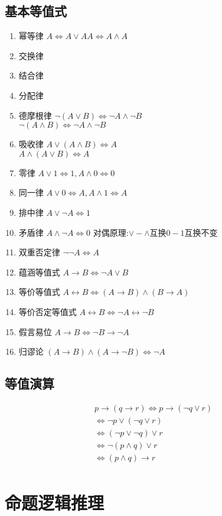 \documentclass{book}
\newcommand{\Eqv}{\Leftrightarrow}
\newcommand{\eqv}{\leftrightarrow}
\begin{document}
\subsection{基本等值式}
\begin{enumerate}
\item 幂等律 $A\Leftrightarrow A\lor A$$A \Leftrightarrow A\land A$
\item 交换律
\item 结合律
\item 分配律
\item 德摩根律 $\neg (A\lor B) \Leftrightarrow \neg A\land \neg B$\\
$\neg (A \land B) \Eqv \neg A \land \neg B$
\item 吸收律 $A\lor (A\land B) \Eqv A$\\
$A \land (A\lor B) \Eqv A$
\item 零律 $A\lor 1\Eqv 1, A\land 0\Eqv 0$
\item 同一律 $A\lor 0\Eqv A, A\land 1\Eqv A$
\item 排中律 $A\lor \neg A \Eqv 1$
\item 矛盾律 $A\land \neg A\Eqv 0$
对偶原理:$\lor - \land$互换$0-1$互换不变
\item 双重否定律 $\neg\neg A\Eqv A$
\item 蕴涵等值式 $A\to B \Eqv \neg A\lor B$
\item 等价等值式 $A\eqv B\Eqv (A\to B)\land (B\to A)$ 
\item 等价否定等值式 $A\eqv B \Eqv \neg A\eqv \neg B$
\item 假言易位 $A\to B \Eqv \neg B \to \neg A$
\item 归谬论 $(A\to B)\land (A\to \neg B)\Eqv \neg A$
\end{enumerate}
\subsection{等值演算}
\begin{align*}
p\to (q\to r)\Eqv p\to (\neg q\lor r)\\
\Eqv \neg p\lor(\neg q\lor r)\\
\Eqv (\neg p \lor \neg q)\lor r\\
\Eqv \neg(p\land q)\lor r\\
\Eqv (p\land q)\to r\\
\end{align*}
\section{命题逻辑推理}
\end{document}
